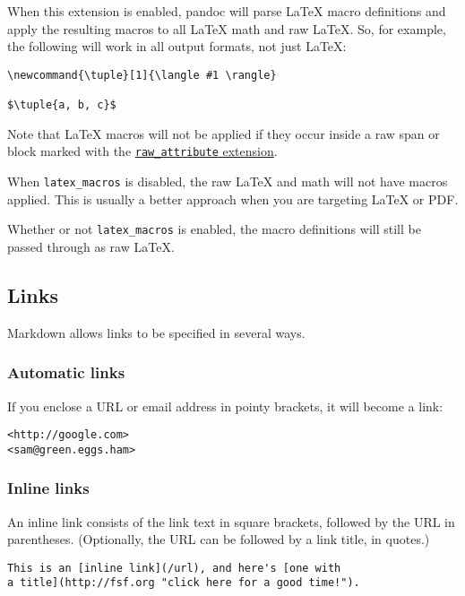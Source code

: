 \documentclass[
  12pt,
  a4paper,
]{article}
\begin{document}
When this extension is enabled, pandoc will parse LaTeX macro definitions and apply the resulting
macros to all LaTeX math and raw LaTeX. So, for example, the following will work in all output
formats, not just LaTeX:

\begin{verbatim}
\newcommand{\tuple}[1]{\langle #1 \rangle}

$\tuple{a, b, c}$
\end{verbatim}

Note that LaTeX macros will not be applied if they occur inside a raw span or block marked with
the \protect\hyperlink{extension-raw_attribute}{\texttt{raw\_attribute} extension}.

When \texttt{latex\_macros} is disabled, the raw LaTeX and math will not have macros applied. This
is usually a better approach when you are targeting LaTeX or PDF.

Whether or not \texttt{latex\_macros} is enabled, the macro definitions will still be passed
through as raw LaTeX.

\hypertarget{links-1}{%
\subsection{Links}\label{links-1}}

Markdown allows links to be specified in several ways.

\hypertarget{automatic-links}{%
\subsubsection{Automatic links}\label{automatic-links}}

If you enclose a URL or email address in pointy brackets, it will become a link:

\begin{verbatim}
<http://google.com>
<sam@green.eggs.ham>
\end{verbatim}

\hypertarget{inline-links}{%
\subsubsection{Inline links}\label{inline-links}}

An inline link consists of the link text in square brackets, followed by the URL in parentheses.
(Optionally, the URL can be followed by a link title, in quotes.)

\begin{verbatim}
This is an [inline link](/url), and here's [one with
a title](http://fsf.org "click here for a good time!").
\end{verbatim}
\end{document}
